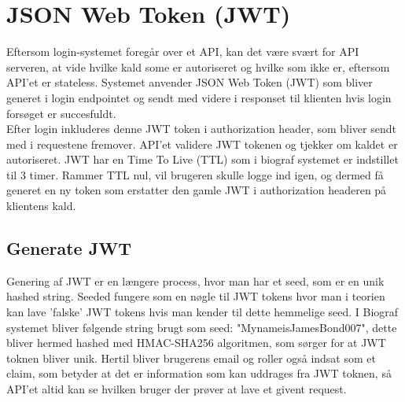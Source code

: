 ﻿\section{JSON Web Token (JWT)}
Eftersom login-systemet foregår over et API, kan det være svært for API serveren, at vide hvilke kald some er autoriseret
og hvilke som ikke er, eftersom API'et er stateless. Systemet anvender JSON Web Token (JWT)
som bliver generet i login endpointet og sendt med videre i responset til klienten hvis login forsøget er succesfuldt.\\

Efter login inkluderes denne JWT token i authorization header, som bliver sendt med i requestene fremover.
API'et validere JWT tokenen og tjekker om kaldet er autoriseret. JWT har en Time To Live (TTL) som i biograf systemet
er indstillet til 3 timer. Rammer TTL nul, vil brugeren skulle logge ind igen, og dermed få generet en ny token som erstatter den
gamle JWT i authorization headeren på klientens kald.\\ 

\subsection{Generate JWT}
Genering af JWT er en længere process, hvor man har et seed, som er en unik hashed string. Seeded fungere som en nøgle
til JWT tokens hvor man i teorien kan lave 'falske' JWT tokens hvis man kender til dette hemmelige seed. I Biograf systemet
bliver følgende string brugt som seed: "MynameisJamesBond007", dette bliver hermed hashed med HMAC-SHA256 algoritmen, 
som sørger for at JWT toknen bliver unik. Hertil bliver brugerens email og roller også indsat som et claim, som betyder
at det er information som kan uddrages fra JWT toknen, så API'et altid kan se hvilken bruger der prøver at lave et givent
request.\\